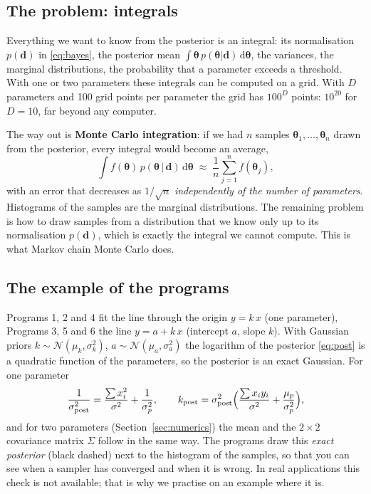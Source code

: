 \documentclass[11pt,a4paper]{article}
\newcommand{\dd}{\mathrm{d}}
\newcommand{\vth}{\boldsymbol{\theta}}
\newcommand{\vd}{\mathbf{d}}
\begin{document}
\subsection{The problem: integrals}\label{sec:integrals}
Everything we want to know from the posterior is an integral: its normalisation $p(\vd)$ in \eqref{eq:bayes},
the posterior mean $\int\vth\,p(\vth|\vd)\,\dd\vth$, the variances, the marginal distributions, the
probability that a parameter exceeds a threshold. With one or two parameters these integrals can be computed on
a grid. With $D$ parameters and 100 grid points per parameter the grid has $100^D$ points: $10^{20}$ for
$D=10$, far beyond any computer.

The way out is \textbf{Monte Carlo integration}: if we had $n$ samples $\vth_1,\dots,\vth_n$ drawn from the
posterior, every integral would become an average,
\begin{equation}
  \int f(\vth)\,p(\vth\,|\,\vd)\,\dd\vth \;\approx\; \frac1n\sum_{j=1}^{n} f(\vth_j),
  \label{eq:mc}
\end{equation}
with an error that decreases as $1/\sqrt{n}$ \emph{independently of the number of parameters}. Histograms of
the samples are the marginal distributions. The remaining problem is how to draw samples from a distribution
that we know only up to its normalisation $p(\vd)$, which is exactly the integral we cannot compute. This is
what Markov chain Monte Carlo does.

\subsection{The example of the programs}\label{sec:example}
Programs 1, 2 and 4 fit the line through the origin $y=k\,x$ (one parameter), Programs 3, 5 and 6 the line
$y=a+k\,x$ (intercept $a$, slope $k$). With Gaussian priors $k\sim\mathcal{N}(\mu_k,\sigma_k^2)$,
$a\sim\mathcal{N}(\mu_a,\sigma_a^2)$ the logarithm of the posterior \eqref{eq:post} is a quadratic function of
the parameters, so the posterior is an exact Gaussian. For one parameter
\begin{equation}
  \frac{1}{\sigma_\text{post}^2} = \frac{\sum x_i^2}{\sigma^2} + \frac{1}{\sigma_p^2},\qquad
  k_\text{post} = \sigma_\text{post}^2\Bigl(\frac{\sum x_i y_i}{\sigma^2} + \frac{\mu_p}{\sigma_p^2}\Bigr),
  \label{eq:exact1}
\end{equation}
and for two parameters (Section~\ref{sec:numerics}) the mean and the $2\times2$ covariance matrix $\Sigma$ follow
in the same way. The programs draw this \emph{exact posterior} (black dashed) next to the histogram of the
samples, so that you can see when a sampler has converged and when it is wrong. In real applications this
check is not available; that is why we practise on an example where it is.
\end{document}
